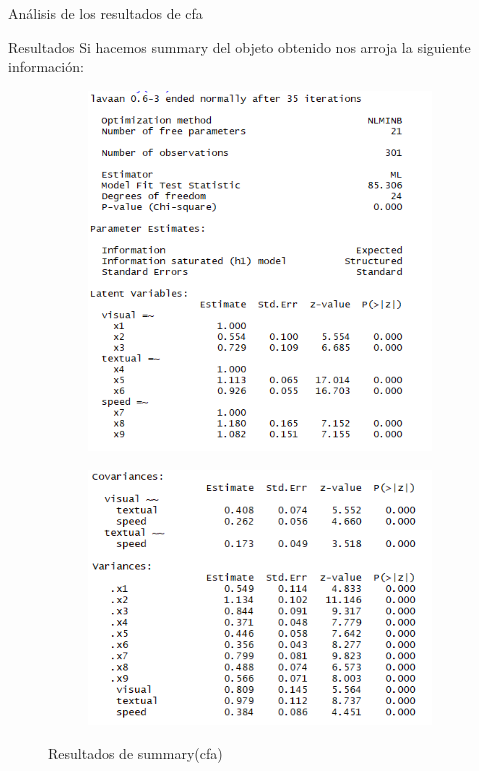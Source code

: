\documentclass[10pt]{beamer}
\begin{document}
\begin{frame}[fragile]{Análisis de los resultados de cfa}
\begin{alertblock}{Resultados}
Si hacemos summary del objeto obtenido nos arroja la siguiente información:
\vspace{10px}
\begin{figure}
	\centering
	\begin{subfigure}{0.49\textwidth}
		\centering
		\includegraphics[scale=0.36]{./Imagenes/res_cfa_sum1.png}
	\end{subfigure}
	\begin{subfigure}{0.49\textwidth}
		\centering
		\includegraphics[scale=0.36]{./Imagenes/res_cfa_sum2.png}
	\end{subfigure}
	\caption{Resultados de summary(cfa)}
\end{figure}
\end{alertblock}
\end{frame}
\end{document}
